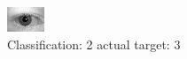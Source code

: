 \begin{figure}[h!]
\begin{center}
\includegraphics[width=0.60\columnwidth]{figures/ID641_class_2_target_3.png}
\end{center}
\caption{ Classification: 2 actual target: 3}
\label{fig:ID641_class_2_target_3}
\end{figure}
